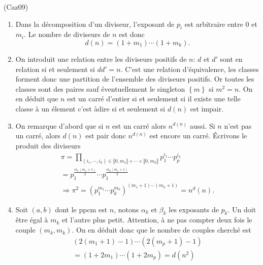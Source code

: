 \begin{tiny}(Caz09)\end{tiny}
\begin{enumerate}
  \item Dans la décomposition d'un diviseur, l'exposant de $p_i$ est arbitraire entre $0$ et $m_i$. Le nombre de diviseurs de $n$ est donc
\begin{displaymath}
 d(n)=(1+m_1)\cdots(1+m_k).
\end{displaymath}
  \item On introduit une relation entre les diviseurs positifs de $n$: $d$ et $d'$ sont en relation si et seulement si $dd'=n$. C'est une relation d'équivalence, les classes forment donc une partition de l'ensemble des diviseurs positifs. Or toutes les classes sont des paires sauf éventuellement le singleton $\left\lbrace m \right\rbrace $ si $m^2 = n$.\newline
  On en déduit que $n$ est un carré d'entier si et seulement si il existe une telle classe à un élement c'est àdire si et seulement si $d(n)$ est impair. 
  \item On remarque d'abord que si $n$ est un carré alors $n^{d(n)}$ aussi. Si $n$ n'est pas un carré, alors $d(n)$ est pair donc $n^{d(n)}$ est encore un carré.\newline
  \'Ecrivons le produit des diviseurs
  \begin{multline*}
   \pi = \prod_{(i_1,\cdots,i_k)\in \llbracket 0,m_1\rrbracket \times \cdots \times \llbracket 0,m_k\rrbracket} p_1^{i_1} \cdots p_p^{i_k}\\
   = p_1^{\frac{m_1(m_1+1)}{2}}\cdots p_1^{\frac{m_p(m_1+1)}{2}}\\
   \Rightarrow \pi^2 = \left(p_1^{m_1}\cdots p_k^{m_k}\right)^{(m_1+1)\cdots(m_k+1)} = n^d(n). 
   \end{multline*}

  \item Soit $(a,b)$ dont le ppcm est $n$, notons $\alpha_k$ et $\beta_k$ les exposants de $p_k$. Un doit être égal à $m_k$ et l'autre plus petit. Attention, à ne pas compter deux fois le couple $(m_k,m_k)$. On en déduit donc que le nombre de couples cherché est
\begin{multline*}
 (2(m_1+1)-1)\cdots (2(m_p+1)-1)\\=(1+2m_1)\cdots(1+2m_p)=d(n^2)
\end{multline*}

\end{enumerate}  
